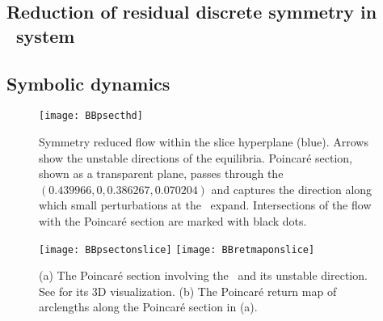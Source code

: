 
\subsection{Reduction of residual discrete symmetry in \twoMode\ system}


\subsection{Symbolic dynamics}

\begin{figure}%
\centering
 \texttt{[image: BBpsecthd]}
\caption{
Symmetry reduced flow within the slice hyperplane (blue). Arrows
show the unstable directions of the equilibria. Poincar\'e section, shown as
a transparent plane, passes through the \reqv\ $(0.439966, 0, 0.386267, 0.070204)$
and captures the direction along which small perturbations at the \reqv\ expand.
Intersections of the flow with the Poincar\'e section are marked with black dots.
}
\label{fig:BBpsecthd}
\end{figure}

\begin{figure}
\centering
  \texttt{[image: BBpsectonslice]}
  \texttt{[image: BBretmaponslice]}
\caption{(a) The Poincar\'e section involving the \reqv\ and its unstable direction.
		  See  for its 3D visualization.
		  (b) The Poincar\'e return map of arclengths along the Poincar\'e section
		  in (a).}
\label{fig:psectandretmap}
\end{figure}


